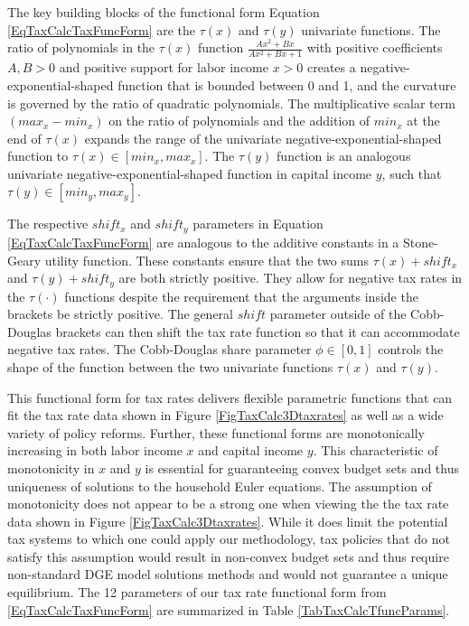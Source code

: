   The key building blocks of the functional form Equation \eqref{EqTaxCalcTaxFuncForm} are the $\tau(x)$ and $\tau(y)$ univariate functions. The ratio of polynomials in the $\tau(x)$ function $\frac{Ax^2 + Bx}{Ax^2 + Bx + 1}$ with positive coefficients $A,B>0$ and positive support for labor income $x>0$ creates a negative-exponential-shaped function that is bounded between 0 and 1, and the curvature is governed by the ratio of quadratic polynomials. The multiplicative scalar term $(max_x-min_x)$ on the ratio of polynomials and the addition of $min_x$ at the end of $\tau(x)$ expands the range of the univariate negative-exponential-shaped function to $\tau(x)\in[min_x, max_x]$. The $\tau(y)$ function is an analogous univariate negative-exponential-shaped function in capital income $y$, such that $\tau(y)\in[min_y,max_y]$.

  The respective $shift_x$ and $shift_y$ parameters in Equation \eqref{EqTaxCalcTaxFuncForm} are analogous to the additive constants in a Stone-Geary utility function. These constants ensure that the two sums $\tau(x) + shift_x$ and $\tau(y) + shift_y$ are both strictly positive. They allow for negative tax rates in the $\tau(\cdot)$ functions despite the requirement that the arguments inside the brackets be strictly positive. The general $shift$ parameter outside of the Cobb-Douglas brackets can then shift the tax rate function so that it can accommodate negative tax rates. The Cobb-Douglas share parameter $\phi\in[0,1]$ controls the shape of the function between the two univariate functions $\tau(x)$ and $\tau(y)$.

  This functional form for tax rates delivers flexible parametric functions that can fit the tax rate data shown in Figure \ref{FigTaxCalc3Dtaxrates} as well as a wide variety of policy reforms. Further, these functional forms are monotonically increasing in both labor income $x$ and capital income $y$. This characteristic of monotonicity in $x$ and $y$ is essential for guaranteeing convex budget sets and thus uniqueness of solutions to the household Euler equations. The assumption of monotonicity does not appear to be a strong one when viewing the the tax rate data shown in Figure \ref{FigTaxCalc3Dtaxrates}. While it does limit the potential tax systems to which one could apply our methodology, tax policies that do not satisfy this assumption would result in non-convex budget sets and thus require non-standard DGE model solutions methods and would not guarantee a unique equilibrium. The 12 parameters of our tax rate functional form from \eqref{EqTaxCalcTaxFuncForm} are summarized in Table \ref{TabTaxCalcTfuncParams}.

